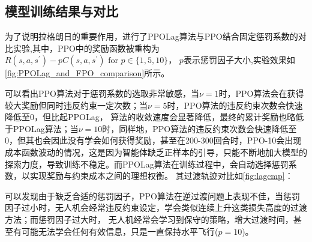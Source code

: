 \subsection{模型训练结果与对比}
为了说明拉格朗日的重要作用，进行了PPOLag算法与PPO结合固定惩罚系数的对比实验,其中，PPO中的奖励函数被重构为$R\left(s, a, s^{\prime}\right)-p C\left(s, a, s^{\prime}\right) \text { for } p \in\{1,5,10\}$，
$p$表示惩罚因子大小,实验效果如\autoref{fig:PPOLag_and_FPO_comparison}所示。

可以看出PPO算法对于惩罚系数的选取非常敏感，当$\nu=1$时，PPO算法会在获得较大奖励但同时违反约束一定次数；当$\nu=5$时，PPO算法的违反约束次数会快速降低至0，但比起PPOLag，
算法的收敛速度会显著降低，最终的累计奖励也略低于PPOLag算法；当$\nu=10$时，同样地，PPO算法的违反约束次数会快速降低至0，但其也会因此没有学会如何获得奖励，甚至在200-300回合时，PPO-10会出现
成本函数波动的情况，这是因为智能体缺乏正样本的引导，只能不断地加大模型的探索力度，导致训练不稳定。而PPOLag算法在训练过程中，会自动选择惩罚系数，以实现奖励与约束成本之间的理想权衡。
其过渡轨迹对比如\autoref{fig:lagcmp}：

可以发现由于缺乏合适的惩罚因子，PPO算法在逆过渡问题上表现不佳，当惩罚因子过小时，无人机会经常违反约束设定，学会类似连续上升这类损失高度的过渡方法；而惩罚因子过大时，
无人机经常会学习到保守的策略，增大过渡时间，甚至有可能无法学会任何有效信息，只是一直保持水平飞行($p=10$)。


